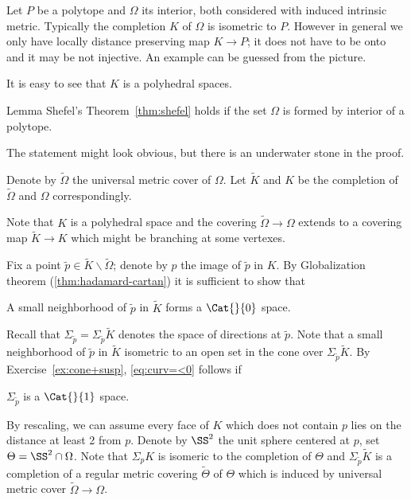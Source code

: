 Let $P$ be a polytope and $\Omega$ its interior,
both considered with induced intrinsic metric.
Typically the completion $K$ of $\Omega$ 
is isometric to $P$.
However in general
we only have locally distance preserving map $K\to P$;
it does not have to be onto and it may be not injective. 
An example can be guessed from the picture.

It is easy to see that $K$ is a polyhedral spaces.


\begin{thm}{Lemma}\label{lem:poly-shefel}
Shefel's Theorem~\ref{thm:shefel} holds if the set $\Omega$ is formed by interior of a polytope.
\end{thm}

The statement might look obvious, but there is an underwater stone in the proof.

Denote by $\tilde\Omega$ the universal metric cover of $\Omega$.
Let $\tilde K$ and $K$ be the completion of $\tilde\Omega$ and  $\Omega$ correspondingly.

Note that $K$ is a polyhedral space and the covering $\tilde\Omega\to\Omega$ extends to a covering map $\tilde K\to K$ which might be branching at some vertexes.

Fix a point $\tilde p\in \tilde K\backslash\tilde\Omega$; 
denote by $p$ the image of $\tilde p$ in $K$.
By Globalization theorem (\ref{thm:hadamard-cartan}) it is sufficient to show that 

\begin{clm}{}\label{eq:curv=<0}
A small neighborhood of $\tilde p$ in $\tilde K$ forms a $\Cat{}{0}$ space.
\end{clm}

Recall that $\Sigma_{\tilde p}=\Sigma_{\tilde p}\tilde K$ denotes the space of directions at $\tilde p$.
Note that a small neighborhood of $\tilde p$ in $\tilde K$
isometric to an open set in the cone over $\Sigma_{\tilde p}\tilde K$.
By Exercise~\ref{ex:cone+susp}, \ref{eq:curv=<0} follows if 

\begin{clm}{}\label{eq:curv=<1}
$\Sigma_{\tilde p}$ is a $\Cat{}{1}$ space.
\end{clm}

By  rescaling, we can assume every face of $K$ which does not contain $p$ lies on the distance at least 2 from $p$.
Denote by $\SS^2$ the unit sphere centered at $p$,
set $\Theta=\SS^2\cap\Omega$.
Note that $\Sigma_pK$ is isomeric to the completion of $\Theta$
and $\Sigma_{\tilde p}\tilde K$ is a completion of a regular metric covering $\tilde\Theta$ of $\Theta$ which is induced by universal metric cover $\tilde \Omega\to \Omega$.

